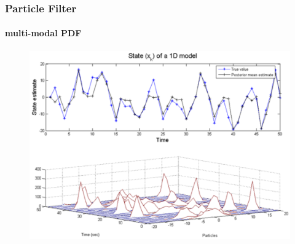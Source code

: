 \begin{frame}
\begin{figure}
\end{figure}
\end{frame}



\begin{frame}
\frametitle{Particle Filter}
\framesubtitle{multi-modal PDF}
\logoCSIPCPL\mypagenum
	\begin{figure}
		\includegraphics[width=1.0\textwidth]{thesis/TRK_ParticleFilter_multimodalPDF.pdf}
	\end{figure}	
\end{frame}


